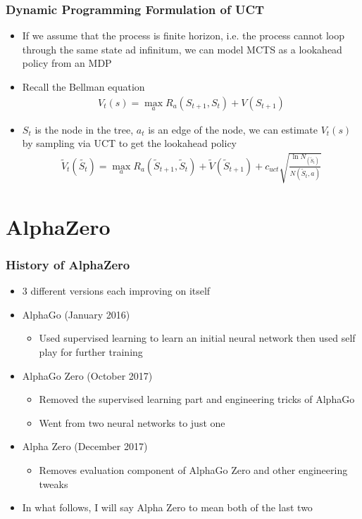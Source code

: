 \documentclass{beamer}
\begin{document}
\begin{frame}
  \frametitle{Dynamic Programming Formulation of UCT}

  \begin{itemize}
      \item If we assume that the process is finite horizon, i.e. the process cannot loop through the same state ad infinitum, we can model MCTS as a lookahead policy from an MDP
      \item Recall the Bellman equation
        \begin{gather*}
          V_t(s) = \max_{a} R_a(S_{t+1}, S_t) + V(S_{t+1})
        \end{gather*}
      \item $S_t$ is the node in the tree, $a_t$ is an edge of the node, we can estimate $V_t(s)$ by sampling via UCT to get the lookahead policy
        \begin{gather*}
          \tilde{V}_t(\tilde{S_t}) = \max_{a} R_a(\tilde{S}_{t+1}, \tilde{S}_t) + \tilde{V}(\tilde{S}_{t+1}) + c_{uct} \sqrt{\frac{\ln N_(\tilde{S}_t)}{N(\tilde{S}_{t}, a)}}
        \end{gather*}
  \end{itemize}
\end{frame}


\section{AlphaZero}


\begin{frame}
  \frametitle{History of AlphaZero}

  \begin{itemize}
    \item 3 different versions each improving on itself
    \item AlphaGo (January 2016)
      \begin{itemize}
        \item Used supervised learning to learn an initial neural network then used self play for further training
      \end{itemize}
    \item AlphaGo Zero (October 2017)
      \begin{itemize}
        \item Removed the supervised learning part and engineering tricks of AlphaGo
        \item Went from two neural networks to just one
      \end{itemize}
    \item Alpha Zero (December 2017)
      \begin{itemize}
        \item Removes evaluation component of AlphaGo Zero and other engineering tweaks
      \end{itemize}
    \item In what follows, I will say Alpha Zero to mean both of the last two
  \end{itemize}
\end{frame}
\end{document}
